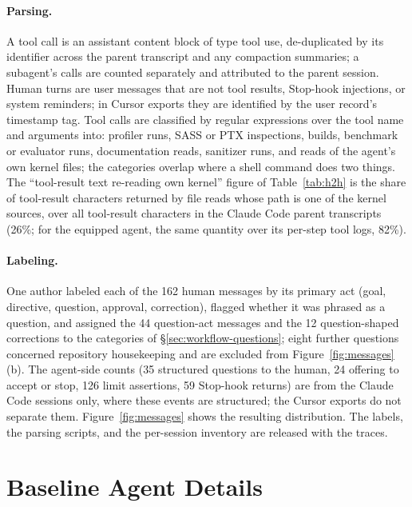 \paragraph{Parsing.} A tool call is an assistant content block of type tool use, de-duplicated by
its identifier across the parent transcript and any compaction summaries; a subagent's calls are
counted separately and attributed to the parent session. Human turns are user messages that are not
tool results, Stop-hook injections, or system reminders; in Cursor exports they are identified by
the user record's timestamp tag. Tool calls are classified by regular expressions over the tool
name and arguments into: profiler runs, SASS or PTX inspections, builds, benchmark or evaluator runs,
documentation reads, sanitizer runs, and reads of the agent's own kernel files; the categories
overlap where a shell command does two things. The ``tool-result text re-reading own kernel'' figure
of Table~\ref{tab:h2h} is the share of tool-result characters returned by file reads whose path is
one of the kernel sources, over all tool-result characters in the Claude Code parent transcripts
(26\%; for the equipped agent, the same quantity over its per-step tool logs, 82\%).

\paragraph{Labeling.} One author labeled each of the 162 human messages by its primary act (goal,
directive, question, approval, correction), flagged whether it was phrased as a question, and
assigned the 44 question-act messages and the 12 question-shaped corrections to the categories of
\S\ref{sec:workflow-questions}; eight further questions concerned repository housekeeping and are
excluded from Figure~\ref{fig:messages}(b). The agent-side counts (35 structured questions to the
human, 24 offering to accept or stop, 126 limit assertions, 59 Stop-hook returns) are from the Claude
Code sessions only, where these events are structured; the Cursor exports do not separate them.
Figure~\ref{fig:messages} shows the resulting distribution. The labels, the parsing scripts, and the
per-session inventory are released with the traces.

\section{Baseline Agent Details}
\label{app:baseline}

